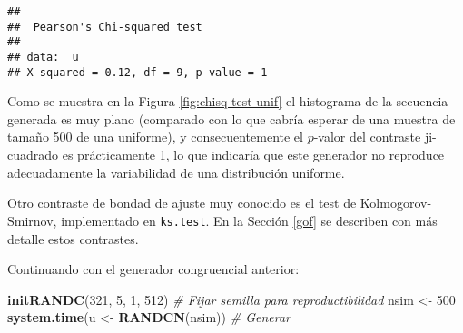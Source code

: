 \documentclass[
]{book}
\newenvironment{Shaded}{\begin{snugshade}}{\end{snugshade}}
\newcommand{\CommentTok}[1]{\textcolor[rgb]{0.56,0.35,0.01}{\textit{#1}}}
\newcommand{\DecValTok}[1]{\textcolor[rgb]{0.00,0.00,0.81}{#1}}
\newcommand{\KeywordTok}[1]{\textcolor[rgb]{0.13,0.29,0.53}{\textbf{#1}}}
\newcommand{\NormalTok}[1]{#1}
\newcommand{\StringTok}[1]{\textcolor[rgb]{0.31,0.60,0.02}{#1}}
\theoremstyle{break}
\theoremstyle{definition}
\theoremstyle{definition}
\theoremstyle{definition}
\theoremstyle{remark}
\let\BeginKnitrBlock\begin \let\EndKnitrBlock\end
\begin{document}
\begin{verbatim}
## 
##  Pearson's Chi-squared test
## 
## data:  u
## X-squared = 0.12, df = 9, p-value = 1
\end{verbatim}

Como se muestra en la Figura \ref{fig:chisq-test-unif} el histograma de la secuencia generada es muy plano (comparado con lo que cabría esperar de una muestra de tamaño 500 de una uniforme), y consecuentemente el \(p\)-valor del contraste ji-cuadrado es prácticamente 1, lo que indicaría que este generador no reproduce adecuadamente la variabilidad de una distribución uniforme.

Otro contraste de bondad de ajuste muy conocido
es el test de Kolmogorov-Smirnov, implementado en \texttt{ks.test}.
En la Sección \ref{gof} se describen con más detalle estos contrastes.

\BeginKnitrBlock{exercise}
\protect\hypertarget{exr:unnamed-chunk-10}{}{\label{exr:unnamed-chunk-10} }
\EndKnitrBlock{exercise}

Continuando con el generador congruencial anterior:

\begin{Shaded}
\begin{Highlighting}[]
\KeywordTok{initRANDC}\NormalTok{(}\DecValTok{321}\NormalTok{, }\DecValTok{5}\NormalTok{, }\DecValTok{1}\NormalTok{, }\DecValTok{512}\NormalTok{)       }\CommentTok{# Fijar semilla para reproductibilidad}
\NormalTok{nsim <-}\StringTok{ }\DecValTok{500}
\KeywordTok{system.time}\NormalTok{(u <-}\StringTok{ }\KeywordTok{RANDCN}\NormalTok{(nsim))  }\CommentTok{# Generar}
\end{Highlighting}
\end{Shaded}
\end{document}
